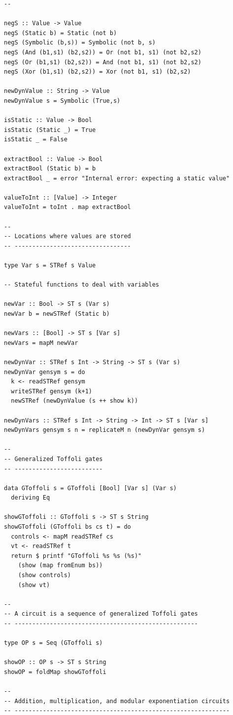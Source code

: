 \documentclass{article}
\begin{document}
\begin{verbatim}
--

negS :: Value -> Value 
negS (Static b) = Static (not b)
negS (Symbolic (b,s)) = Symbolic (not b, s)
negS (And (b1,s1) (b2,s2)) = Or (not b1, s1) (not b2,s2)
negS (Or (b1,s1) (b2,s2)) = And (not b1, s1) (not b2,s2)
negS (Xor (b1,s1) (b2,s2)) = Xor (not b1, s1) (b2,s2)

newDynValue :: String -> Value
newDynValue s = Symbolic (True,s)

isStatic :: Value -> Bool
isStatic (Static _) = True
isStatic _ = False

extractBool :: Value -> Bool
extractBool (Static b) = b
extractBool _ = error "Internal error: expecting a static value"

valueToInt :: [Value] -> Integer
valueToInt = toInt . map extractBool

--
-- Locations where values are stored
-- ---------------------------------

type Var s = STRef s Value

-- Stateful functions to deal with variables

newVar :: Bool -> ST s (Var s)
newVar b = newSTRef (Static b)

newVars :: [Bool] -> ST s [Var s]
newVars = mapM newVar

newDynVar :: STRef s Int -> String -> ST s (Var s)
newDynVar gensym s = do
  k <- readSTRef gensym
  writeSTRef gensym (k+1)
  newSTRef (newDynValue (s ++ show k))

newDynVars :: STRef s Int -> String -> Int -> ST s [Var s]
newDynVars gensym s n = replicateM n (newDynVar gensym s)

--
-- Generalized Toffoli gates
-- -------------------------

data GToffoli s = GToffoli [Bool] [Var s] (Var s)
  deriving Eq

showGToffoli :: GToffoli s -> ST s String
showGToffoli (GToffoli bs cs t) = do
  controls <- mapM readSTRef cs
  vt <- readSTRef t
  return $ printf "GToffoli %s %s (%s)"
    (show (map fromEnum bs))
    (show controls)
    (show vt)

--
-- A circuit is a sequence of generalized Toffoli gates
-- ----------------------------------------------------

type OP s = Seq (GToffoli s)

showOP :: OP s -> ST s String
showOP = foldMap showGToffoli

--
-- Addition, multiplication, and modular exponentiation circuits
-- -------------------------------------------------------------


\end{verbatim}
\end{document}
